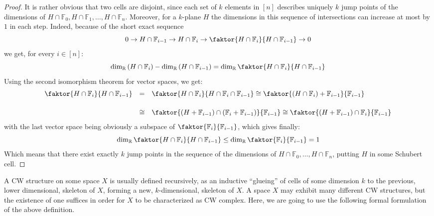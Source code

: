 \begin{proof} It is rather obvious that two cells are disjoint, since each set of $k$ elements in $[n]$ describes uniquely $k$ jump points of the dimensions of $H\cap\mathbb{F}_0,H\cap\mathbb{F}_1,\ldots,H\cap\mathbb{F}_n$. Moreover, for a $k$-plane $H$ the dimensions in this sequence of intersections can increase at most by $1$ in each step. Indeed, because of the short exact sequence
$$0\to H\cap\mathbb{F}_{i-1}\to H\cap\mathbb{F}_i\to\faktor{H\cap\mathbb{F}_i}{H\cap\mathbb{F}_{i-1}}\to0$$
we get, for every $i\in[n]$:
$$\dim_{\mathbb{R}}\left(H\cap\mathbb{F}_i\right)-\dim_{\mathbb{R}}\left(H\cap\mathbb{F}_{i-1}\right)=\dim_{\mathbb{R}}\faktor{H\cap\mathbb{F}_i}{H\cap\mathbb{F}_{i-1}}$$
Using the second isomorphism theorem for vector spaces, we get:
$$\begin{array}{>{\displaystyle}r>{\displaystyle}c>{\displaystyle}l}\faktor{H\cap\mathbb{F}_i}{H\cap\mathbb{F}_{i-1}}
&=&\faktor{H\cap\mathbb{F}_i}{H\cap\mathbb{F}_i\cap\mathbb{F}_{i-1}}\cong\faktor{(H\cap\mathbb{F}_i)+\mathbb{F}_{i-1}}{\mathbb{F}_{i-1}}\\[1.5em]
&\cong&\faktor{(H+\mathbb{F}_{i-1})\cap(\mathbb{F}_i+\mathbb{F}_{i-1})}{\mathbb{F}_{i-1}}\cong\faktor{(H+\mathbb{F}_{i-1})\cap\mathbb{F}_i}{\mathbb{F}_{i-1}}\\
\end{array}$$
with the last vector space being obviously a subspace of $\faktor{\mathbb{F}_i}{\mathbb{F}_{i-1}}$, which gives finally:
$$\dim_{\mathbb{R}}\faktor{H\cap\mathbb{F}_i}{H\cap\mathbb{F}_{i-1}}\leq\dim_{\mathbb{R}}\faktor{\mathbb{F}_i}{\mathbb{F}_{i-1}}=1$$
Which means that there exist exactly $k$ jump points in the sequence of the dimensions of $H\cap\mathbb{F}_0,\ldots,H\cap\mathbb{F}_n$, putting $H$ in some Schubert cell.
\end{proof}

A CW structure on some space $X$ is usually defined recursively, as an inductive ``glueing'' of cells of some dimension $k$ to the previous, lower dimensional, skeleton of $X$, forming a new, $k$-dimensional, skeleton of $X$. A space $X$ may exhibit many different CW structures, but the existence of one suffices in order for $X$ to be characterized as CW complex. Here, we are going to use the following formal formulation of the above definition.

